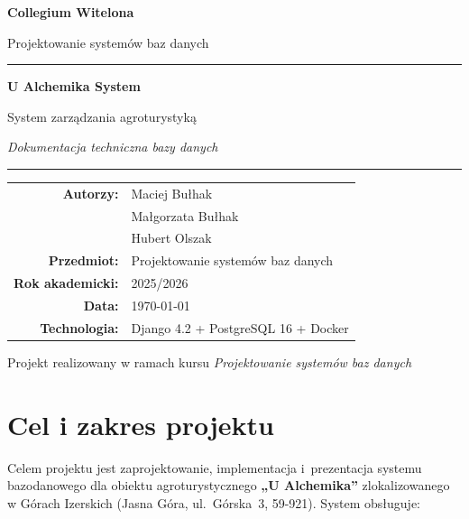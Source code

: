 \documentclass[12pt,a4paper]{article}
\begin{document}
\begin{titlepage}
  \centering
  \vspace*{2cm}
  {\LARGE\bfseries Collegium Witelona \par}
  \vspace{0.5cm}
  {\large Projektowanie systemów baz danych \par}
  \vspace{2.5cm}

  \rule{\linewidth}{0.5mm}
  \vspace{0.6cm}
  {\Huge\bfseries U Alchemika System \par}
  \vspace{0.4cm}
  {\Large System zarządzania agroturystyką \par}
  \vspace{0.4cm}
  {\large\itshape Dokumentacja techniczna bazy danych \par}
  \rule{\linewidth}{0.5mm}

  \vspace{2cm}
  \begin{tabular}{rl}
    \textbf{Autorzy:}      & Maciej Bułhak \\[4pt]
                           & Małgorzata Bułhak \\[4pt]
                           & Hubert Olszak \\[4pt]
    \textbf{Przedmiot:}    & Projektowanie systemów baz danych \\[4pt]
    \textbf{Rok akademicki:} & 2025/2026 \\[4pt]
    \textbf{Data:}         & \today \\[4pt]
    \textbf{Technologia:}  & Django 4.2 + PostgreSQL 16 + Docker \\
  \end{tabular}

  \vfill
  {\small Projekt realizowany w ramach kursu \emph{Projektowanie systemów baz danych} \par}
\end{titlepage}

\tableofcontents
\newpage

\section{Cel i zakres projektu}

Celem projektu jest zaprojektowanie, implementacja i~prezentacja systemu bazodanowego
dla obiektu agroturystycznego \textbf{„U Alchemika”} zlokalizowanego w Górach Izerskich
(Jasna Góra, ul.~Górska~3, 59-921). System obsługuje:
\end{document}
